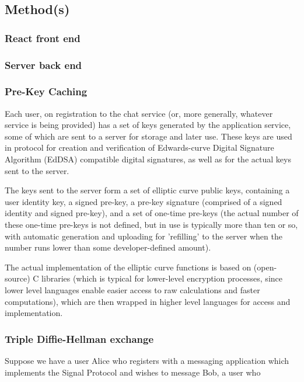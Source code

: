 \documentclass[12pt]{article}
\begin{document}
\newpage
\subsection{Method(s)}
\subsubsection{React front end}
\subsubsection{Server back end}
\subsubsection{Pre-Key Caching}
Each user, on registration to the chat service (or, more generally, whatever service is being provided) has a set of keys generated by the application service, some of which are sent to a server for storage and later use. These keys are used in protocol for creation and verification of Edwards-curve Digital Signature Algorithm (EdDSA) compatible digital signatures, as well as for the actual keys sent to the server. \parencite{website:sigdocXEdDSA} 
\par The keys sent to the server form a set of elliptic curve public keys, containing a user identity key, a signed pre-key, a pre-key signature (comprised of a signed identity and signed pre-key), and a set of one-time pre-keys \parencite{website:sigdocX3DH} (the actual number of these one-time pre-keys is not defined, but in use is typically more than ten or so, with automatic generation and uploading for 'refilling' to the server when the number runs lower than some developer-defined amount).
\par The actual implementation of the elliptic curve functions is based on (open-source) C libraries (which is typical for lower-level encryption processes, since lower level languages enable easier access to raw calculations and faster computations), which are then wrapped in higher level languages for access and implementation. \parencite{website:prglibsigtypescriptCurve25519}\parencite{website:prglibsigtypescriptCurve25519rawC}

\subsubsection{Triple Diffie-Hellman exchange}
Suppose we have a user Alice who registers with a messaging application which implements the Signal Protocol and wishes to message Bob, a user who 
\end{document}
